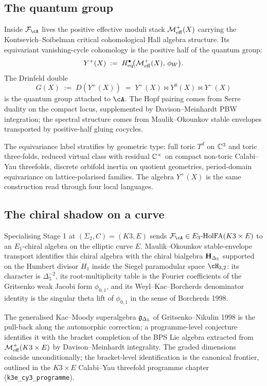 \subsection{The quantum group}
\label{wn:sec:platonic-intro-quantum-group-wn}

Inside $\cF_\cA$ lives the positive effective moduli stack
$\mathcal{M}^{+}_{\mathrm{eff}}(X)$ carrying the Kontsevich--Soibelman critical cohomological
Hall algebra structure. Its equivariant vanishing-cycle cohomology
is the positive half of the quantum group:
\[
Y^+(X) \;:=\; H^{\bullet}_{\mathrm{eq}}\!\bigl(\mathcal{M}^{+}_{\mathrm{eff}}(X),\,\phi_W\bigr).
\]
The Drinfeld double
\[
G(X) \;:=\; D(Y^+(X)) \;=\; Y^+(X) \bowtie Y^0(X) \bowtie Y^-(X)
\]
is the quantum group attached to $\cA$. The Hopf pairing comes from
Serre duality on the compact locus, supplemented by
Davison--Meinhardt PBW integration; the spectral structure comes from
Maulik--Okounkov stable envelopes transported by positive-half
gluing cocycles.

The equivariance label stratifies by geometric type: full toric $T^d$
on $\mathbb{C}^3$ and toric three-folds, reduced virtual class with residual
$\mathbb{C}^\times$ on compact non-toric Calabi--Yau threefolds, discrete
orbifold inertia on quotient geometries, period-domain equivariance
on lattice-polarised families. The algebra $Y^+(X)$ is the same
construction read through four local languages.

\subsection{The chiral shadow on a curve}
\label{wn:sec:platonic-intro-chiral-shadow-wn}

Specialising Stage 1 at $(\Sigma_2, C) = (K3, E)$ sends
$\cF_\cA \in E_3\text{-}\HolFA(K3 \times E)$ to an $E_1$-chiral
algebra on the elliptic curve $E$. Maulik--Okounkov stable-envelope
transport identifies this chiral algebra with the chiral bialgebra
$\mathbf{H}_{\Delta_5}$ supported on the Humbert divisor $H_1$ inside the
Siegel paramodular space $\cH_{3,2}$: its character is $\Delta_5^{-2}$,
its root-multiplicity table is the Fourier coefficients of the
Gritsenko weak Jacobi form $\phi_{0,1}$, and its Weyl--Kac--Borcherds
denominator identity is the singular theta lift of $\phi_{0,1}$ in
the sense of Borcherds 1998.

The generalised Kac--Moody superalgebra $\mathfrak{g}_{\Delta_5}$ of
Gritsenko--Nikulin 1998 is the pull-back along the automorphic
correction; a programme-level conjecture identifies it with the
bracket completion of the BPS Lie algebra extracted from
$\mathcal{M}^{+}_{\mathrm{eff}}(K3 \times E)$ by Davison--Meinhardt integrality. The
graded dimensions coincide unconditionally; the bracket-level
identification is the canonical frontier, outlined in the
$K3 \times E$ Calabi--Yau threefold programme chapter
(\texttt{k3e\_cy3\_programme}).

